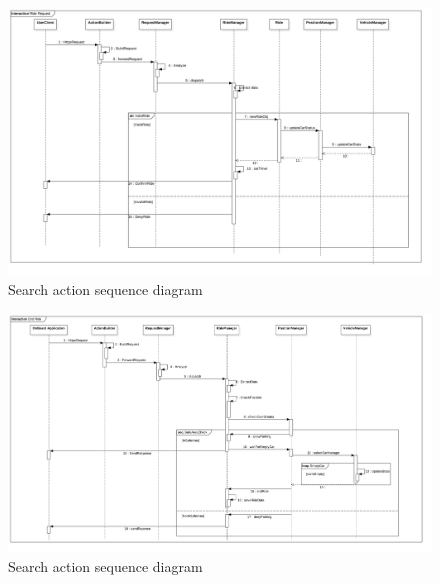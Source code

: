 \FloatBarrier
\clearpage
\FloatBarrier
\begin{figure}
\centering
\includegraphics[scale=0.4]{Images/Sequence/seq3.png}
\caption{Search action sequence diagram}
\end{figure}
\FloatBarrier
\FloatBarrier
\begin{figure}
\centering
\includegraphics[scale=0.4]{Images/Sequence/Seq4.png}
\caption{Search action sequence diagram}
\end{figure}
\FloatBarrier




\newpage




